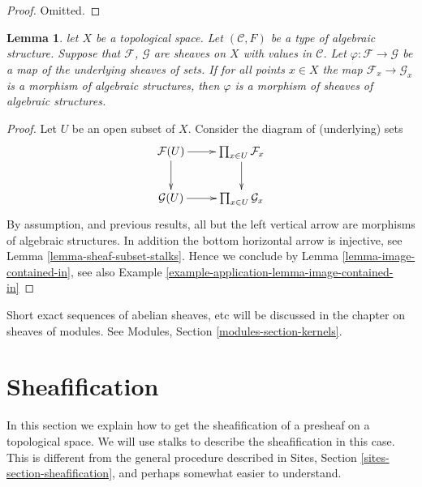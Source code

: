\documentclass{stacks-project}
\theoremstyle{plain}
\newtheorem{lemma}[subsection]{Lemma}
\theoremstyle{definition}
\theoremstyle{remark}
\numberwithin{equation}{subsection}
\begin{document}
\begin{proof}
Omitted.
\end{proof}


\begin{lemma}
\label{lemma-check-homomorphism-stalks}
let $X$ be a topological space.
Let $(\mathcal{C}, F)$ be a type of algebraic structure.
Suppose that $\mathcal{F}$, $\mathcal{G}$ are sheaves on $X$
with values in $\mathcal{C}$.
Let $\varphi : \mathcal{F} \to \mathcal{G}$
be a map of the underlying sheaves of sets.
If for all points $x \in X$ the map
$\mathcal{F}_x \to \mathcal{G}_x$
is a morphism of algebraic structures,
then $\varphi$ is a morphism of sheaves of algebraic structures.
\end{lemma}

\begin{proof}
Let $U$ be an open subset of $X$. Consider the diagram of
(underlying) sets
$$
\xymatrix{
\mathcal{F}(U) \ar[r] \ar[d] &
\prod_{x \in U} \mathcal{F}_x \ar[d] \\
\mathcal{G}(U) \ar[r] &
\prod_{x \in U} \mathcal{G}_x
}
$$
By assumption, and previous results, all but the left vertical
arrow are morphisms of algebraic structures. In addition the
bottom horizontal arrow is injective,
see Lemma \ref{lemma-sheaf-subset-stalks}.
Hence we conclude by Lemma \ref{lemma-image-contained-in},
see also Example \ref{example-application-lemma-image-contained-in}
\end{proof}

\noindent
Short exact sequences of abelian sheaves, etc will be discussed
in the chapter on sheaves of modules. See
Modules, Section \ref{modules-section-kernels}.




\section{Sheafification}
\label{section-sheafification}

\noindent
In this section we explain how to get the sheafification
of a presheaf on a topological space. We will use stalks
to describe the sheafification in this case. This is different
from the general procedure described in Sites, Section
\ref{sites-section-sheafification}, and perhaps somewhat
easier to understand.
\end{document}
